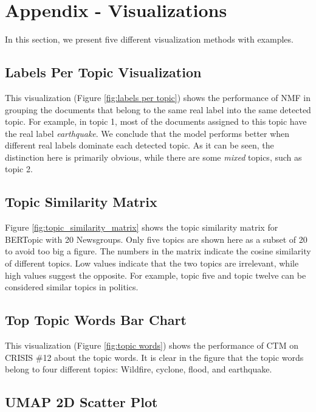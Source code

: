 \documentclass[11pt]{article}
\begin{document}
\section{Appendix - Visualizations}
\label{sec:appendix}
In this section, we present five different visualization methods with examples.
\subsection{Labels Per Topic Visualization} \label{appendix_labels_per_topic_visualization}
This visualization (Figure \ref{fig:labels per topic}) shows the performance of NMF in grouping the documents that belong to the same real label into the same detected topic. For example, in topic 1, most of the documents assigned to this topic have the real label \emph{earthquake}. We conclude that the model performs better when different real labels dominate each detected topic. As it can be seen, the distinction here is primarily obvious, while there are some \emph{mixed} topics, such as topic 2.

\subsection{Topic Similarity Matrix}\label{appendix_topic_similarity_matrix}
Figure \ref{fig:topic_similarity_matrix} shows the topic similarity matrix for BERTopic with 20 Newsgroups. Only five topics are shown here as a subset of 20 to avoid too big a figure. The numbers in the matrix indicate the cosine similarity of different topics. Low values indicate that the two topics are irrelevant, while high values suggest the opposite. For example, topic five and topic twelve can be considered similar topics in politics.

\subsection{Top Topic Words Bar Chart}\label{appendix_top_words_bar_chart}
This visualization (Figure \ref{fig:topic words}) shows the performance of CTM on CRISIS \#12 about the topic words. It is clear in the figure that the topic words belong to four different topics: Wildfire, cyclone, flood, and earthquake.

\subsection{UMAP 2D Scatter Plot}\label{appendix_umap2d_visualization}
\end{document}
